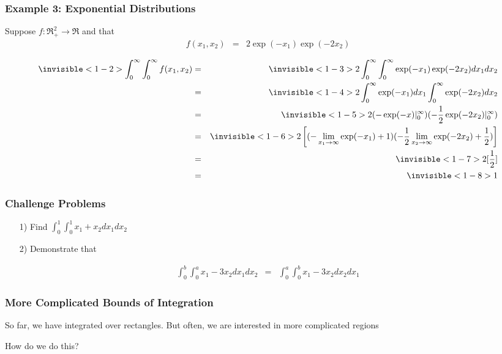 \documentclass{beamer}
\numberwithin{equation}{section}
\begin{document}
\begin{frame}
\frametitle{Example 3: Exponential Distributions}
Suppose $f:\Re^{2}_{+} \rightarrow \Re$ and that 
\begin{eqnarray}
f(x_{1}, x_{2}) &= &  2 \exp(-x_{1}) \exp(-2 x_{2} ) \nonumber 
\end{eqnarray}
\pause 

 \pause 
\small
\begin{eqnarray}
\invisible<1-2>{\int_{0}^{\infty} \int_{0}^{\infty} f(x_{1}, x_{2})} & = & \invisible<1-3>{2 \int_{0}^{\infty} \int_{0}^{\infty} \exp(-x_{1}) \exp(-2x_{2}) dx_{1} dx_{2} }  \nonumber \\
& = & \invisible<1-4>{2 \int_{0}^{\infty}\exp(-x_{1}) dx_{1}\int_{0}^{\infty}  \exp(-2x_{2}) dx_{2} \nonumber}  \\
& = & \invisible<1-5>{2 ( - \exp(-x)|^{\infty}_{0} ) (-\frac{1}{2} \exp(-2x_{2} ) |^{\infty}_{0}  ) \nonumber}  \\
& = & \invisible<1-6>{2 \left[  (- \lim_{x_{1} \rightarrow \infty} \exp(-x_{1} )  + 1 ) (-\frac{1}{2} \lim_{x_{2} \rightarrow \infty} \exp(-2x_{2})  + \frac{1}{2} ) \right] \nonumber } \\
& = & \invisible<1-7>{ 2 [ \frac{1}{2} ] \nonumber}  \\
& = & \invisible<1-8>{1 \nonumber } 
\end{eqnarray}

\pause \pause \pause \pause \pause \pause \pause 


\end{frame}


\begin{frame}
\frametitle{Challenge Problems}


\begin{itemize}
\item[1)] Find $\int_{0}^{1} \int_{0}^{1} x_{1} + x_{2} dx_{1} dx_{2} $
\item[2)] Demonstrate that 
\end{itemize}
\begin{eqnarray}
\int_{0}^{b} \int_{0}^{a} x_{1} - 3x_{2}  dx_{1} dx_{2} & = & \int_{0}^{a} \int_{0}^{b} x_{1} - 3x_{2} dx_{2} dx_{1} \nonumber 
\end{eqnarray}



\end{frame}



\begin{frame}
\frametitle{More Complicated Bounds of Integration}

So far, we have integrated over \alert{rectangles}.  But often, we are interested in more complicated regions\pause 



How do we do this?


\end{frame}
\end{document}
